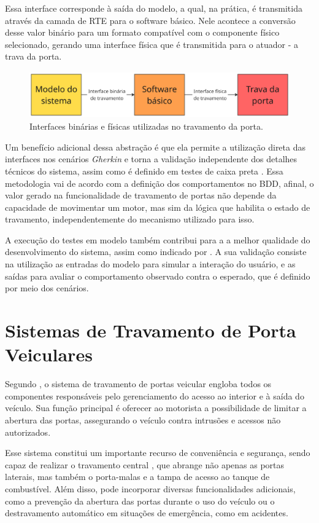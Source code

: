Essa interface corresponde à saída do modelo, a qual, na prática, é transmitida através da camada de RTE para o software básico. Nele acontece a conversão desse 
valor binário para um formato compatível com o componente físico selecionado, gerando uma interface física que é transmitida para o atuador - a trava da porta. 

\begin{figure}[H]
\centering
\includegraphics[height=2cm]{figuras/diagrama_interface.png}
\caption{Interfaces binárias e físicas utilizadas no travamento da porta.}
\label{fig:diagramainterface}
\end{figure}

Um benefício adicional dessa abstração é que ela permite a utilização direta das interfaces nos cenários \textit{Gherkin} e torna a validação independente dos detalhes 
técnicos do sistema, assim como é definido em testes de caixa preta \cite{sommerville2019}. Essa metodologia vai de acordo com a definição dos comportamentos no BDD, 
afinal, o valor gerado na funcionalidade de travamento de portas não depende da capacidade de movimentar um motor, mas sim da lógica que habilita o estado de travamento, 
independentemente do mecanismo utilizado para isso.

A execução do testes em modelo também contribui para a a melhor qualidade do desenvolvimento do sistema, assim como indicado por . A sua 
validação consiste na utilização as entradas do modelo para simular a interação do usuário, e as saídas para avaliar o comportamento observado contra o esperado, 
que é definido por meio dos cenários. 

\section{\textbf{Sistemas de Travamento de Porta Veiculares}}
Segundo , o sistema de travamento de portas veicular engloba todos os componentes responsáveis pelo gerenciamento do acesso ao interior 
e à saída do veículo. Sua função principal é oferecer ao motorista a possibilidade de limitar a abertura das portas, assegurando o veículo contra intrusões e acessos 
não autorizados.

Esse sistema constitui um importante recurso de conveniência e segurança, sendo capaz de realizar o travamento central \cite{reif2017locking}, que abrange não apenas 
as portas laterais, mas também o porta-malas e a tampa de acesso ao tanque de combustível. Além disso, pode incorporar diversas funcionalidades adicionais, como a 
prevenção da abertura das portas durante o uso do veículo ou o destravamento automático em situações de emergência, como em acidentes.

